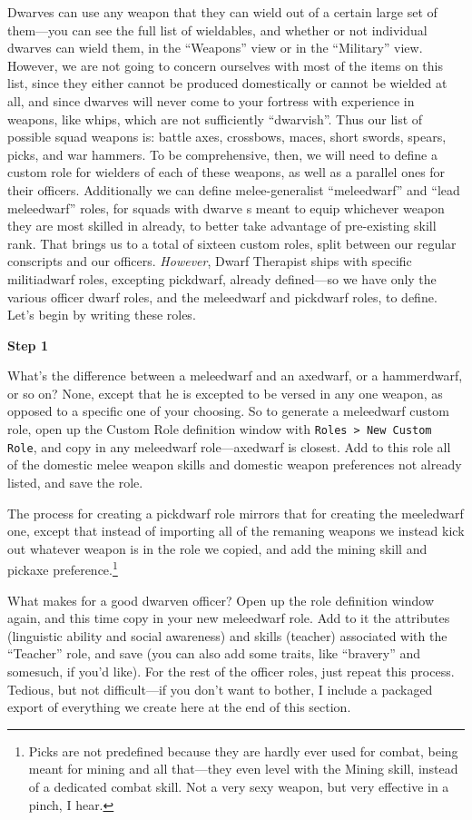 \documentclass[]{article}
\newcommand{\step}[1] {
\vspace{12pt}
\noindent \textbf{Step #1}
}
\begin{document}
Dwarves can use any weapon that they can wield out of a certain large set of them---you can see the full
list of wieldables, and whether or not individual dwarves can wield them, in the ``Weapons'' view or in
the ``Military'' view. However, we are not going to concern ourselves with most of the items on this
list, since they either cannot be produced domestically or cannot be wielded at all, and since dwarves
will never come to your fortress with experience in weapons, like whips, which are not
sufficiently ``dwarvish''. Thus our list of possible squad weapons is: battle axes, crossbows, maces,
short swords, spears, picks, and war hammers. To be comprehensive, then, we will need to define a custom
role for wielders of each of these weapons, as well as a parallel ones for their officers. Additionally
we can define melee-generalist ``meleedwarf'' and ``lead meleedwarf'' roles, for squads with dwarve s
meant to equip whichever weapon they are most skilled in already, to better take advantage of
pre-existing skill rank. That brings us to a total of sixteen custom roles, split between our regular
conscripts and our officers. \emph{However}, Dwarf Therapist ships with specific militiadwarf roles,
excepting pickdwarf, already defined---so we have only the various officer dwarf roles, and the
meleedwarf and pickdwarf roles, to define. Let's begin by writing these roles.

\step{1}
What's the difference between a meleedwarf and an axedwarf, or a hammerdwarf, or so on? None, except that
he is excepted to be versed in any one weapon, as opposed to a specific one of your choosing. So to
generate a meleedwarf custom role, open up the Custom Role definition window with \texttt{Roles > New
Custom Role}, and copy in any meleedwarf role---axedwarf is closest. Add to this role all of the
domestic melee weapon skills and domestic weapon preferences not already listed, and save the role.

The process for creating a pickdwarf role mirrors that for creating the meeledwarf one, except that
instead of importing all of the remaning weapons we instead kick out whatever weapon is in the role we
copied, and add the mining skill and pickaxe preference.\footnote{Picks are not predefined because they
are hardly ever used for combat, being meant for mining and all that---they even level with the
Mining skill, instead of a dedicated combat skill. Not a very sexy weapon, but very effective in a
pinch, I hear.}

What makes for a good dwarven officer? Open up the role definition window again, and this time copy in
your new meleedwarf role. Add to it the attributes (linguistic ability and social awareness) and skills
(teacher) associated with the ``Teacher'' role, and save (you can also add some traits, like ``bravery''
and somesuch, if you'd like). For the rest of the officer roles, just repeat this process. Tedious, but
not difficult---if you don't want to bother, I include a packaged export of everything we create here at
the end of this section.
\end{document}
